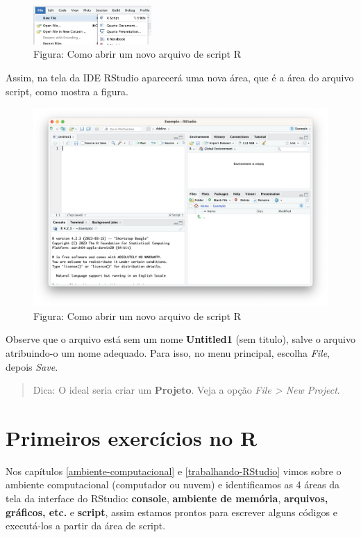 \documentclass[
]{book}
\begin{document}
\begin{figure}
\centering
\includegraphics[width=0.4\textwidth,height=\textheight]{arquivoScript.png}
\caption{Figura: Como abrir um novo arquivo de script R}
\end{figure}

Assim, na tela da IDE RStudio aparecerá uma nova área, que é a área do arquivo script, como mostra a figura.

\begin{figure}
\centering
\includegraphics{telaScript.png}
\caption{Figura: Como abrir um novo arquivo de script R}
\end{figure}

Observe que o arquivo está sem um nome \textbf{Untitled1} (sem titulo), salve o arquivo atribuindo-o um nome adequado. Para isso, no menu principal, escolha \emph{File}, depois \emph{Save}.

\begin{quote}
Dica: O ideal seria criar um \textbf{Projeto}. Veja a opção \emph{File \textgreater{} New Project}.
\end{quote}

\chapter{Primeiros exercícios no R}\label{primeiros-exercuxedcios-no-r}

Nos capítulos \ref{ambiente-computacional} e \ref{trabalhando-RStudio} vimos sobre o ambiente computacional (computador ou nuvem) e identificamos as 4 áreas da tela da interface do RStudio: \textbf{console}, \textbf{ambiente de memória}, \textbf{arquivos, gráficos, etc.} e \textbf{script}, assim estamos prontos para escrever alguns códigos e executá-los a partir da área de script.
\end{document}
